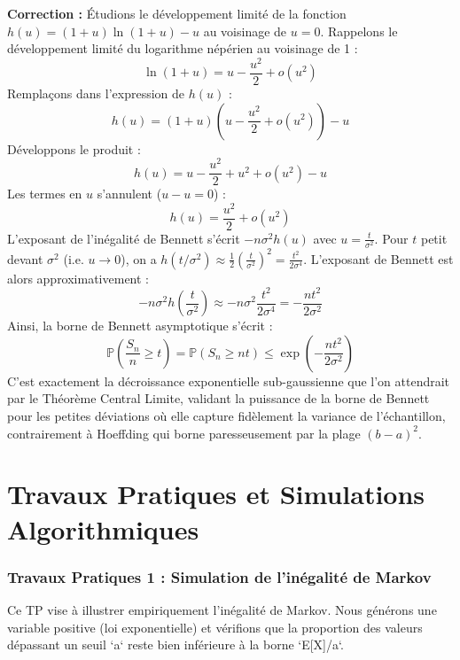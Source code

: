 \documentclass[11pt,a4paper]{article}
\begin{document}
\textbf{Correction :}
Étudions le développement limité de la fonction $h(u) = (1+u)\ln(1+u) - u$ au voisinage de $u = 0$.
Rappelons le développement limité du logarithme népérien au voisinage de 1 :
$$ \ln(1+u) = u - \frac{u^2}{2} + o(u^2) $$
Remplaçons dans l'expression de $h(u)$ :
$$ h(u) = (1+u)\left(u - \frac{u^2}{2} + o(u^2)\right) - u $$
Développons le produit :
$$ h(u) = u - \frac{u^2}{2} + u^2 + o(u^2) - u $$
Les termes en $u$ s'annulent ($u - u = 0$) :
$$ h(u) = \frac{u^2}{2} + o(u^2) $$
L'exposant de l'inégalité de Bennett s'écrit $-n \sigma^2 h(u)$ avec $u = \frac{t}{\sigma^2}$.
Pour $t$ petit devant $\sigma^2$ (i.e. $u \to 0$), on a $h(t/\sigma^2) \approx \frac{1}{2} \left(\frac{t}{\sigma^2}\right)^2 = \frac{t^2}{2\sigma^4}$.
L'exposant de Bennett est alors approximativement :
$$ -n \sigma^2 h\left(\frac{t}{\sigma^2}\right) \approx -n \sigma^2 \frac{t^2}{2\sigma^4} = - \frac{nt^2}{2\sigma^2} $$
Ainsi, la borne de Bennett asymptotique s'écrit :
$$ \mathbb{P}\left(\frac{S_n}{n} \ge t\right) = \mathbb{P}(S_n \ge nt) \le \exp\left( - \frac{n t^2}{2\sigma^2} \right) $$
C'est exactement la décroissance exponentielle sub-gaussienne que l'on attendrait par le Théorème Central Limite, validant la puissance de la borne de Bennett pour les petites déviations où elle capture fidèlement la variance de l'échantillon, contrairement à Hoeffding qui borne paresseusement par la plage $(b-a)^2$.



\newpage
\part{Travaux Pratiques et Simulations Algorithmiques}
\section*{Travaux Pratiques 1 : Simulation de l'inégalité de Markov}

Ce TP vise à illustrer empiriquement l'inégalité de Markov.
Nous générons une variable positive (loi exponentielle) et vérifions que la proportion des valeurs dépassant un seuil `a` reste bien inférieure à la borne `E[X]/a`.
\end{document}
